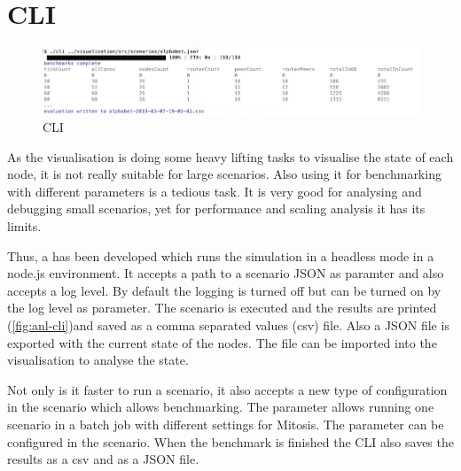 \section{CLI}

\begin{figure}
\centering
\includegraphics[width=1\textwidth]{graphics/analysis-tools/cli.jpg}
\caption{CLI}
\label{fig:anl-cli}
\end{figure}

As the visualisation is doing some heavy lifting tasks to visualise the state of each node, it is not really suitable for large scenarios. Also using it for benchmarking with different parameters is a tedious task. It is very good for analysing and debugging small scenarios, yet for performance and scaling analysis it has its limits.

Thus, a  has been developed which runs the simulation in a headless mode in a node.js environment. It accepts a path to a scenario JSON as paramter and also accepts a log level. By default the logging is turned off but can be turned on by the log level as parameter. The scenario is executed and the results are printed (\vref{fig:anl-cli})and saved as a comma separated values (csv) file. Also a JSON file is exported with the current state of the nodes. The file can be imported into the visualisation to analyse the state.

Not only is it faster to run a scenario, it also accepts a new type of configuration in the scenario which allows benchmarking. The parameter allows running one scenario in a batch job with different settings for Mitosis. The parameter can be configured in the scenario. When the benchmark is finished the CLI also saves the results as a csv and as a JSON file.